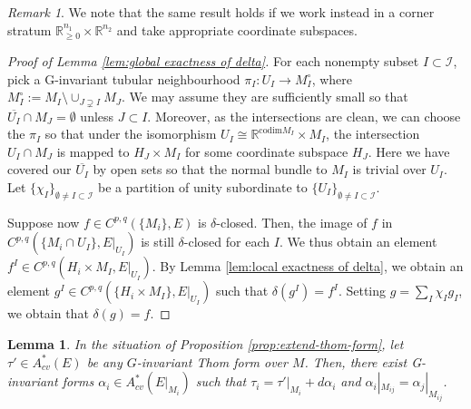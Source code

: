 \documentclass[11pt,psamsfonts, oneside, reqno]{amsart}
\newcommand{\cc}[1]{\overline{#1}}
\newcommand{\sub}{\subset}%
\newcommand{\ssuper}{\supsetneq}
\newcommand{\cl}{\colon}
\newcommand{\emst}{\emptyset}
\newcommand{\bR}{\mathbb{R}}
\newcommand{\cI}{\mathcal{I}}
\newtheorem{lemma}[theorem]{Lemma}
\theoremstyle{definition}
\theoremstyle{remark}
\newtheorem{remark}[theorem]{Remark}
\numberwithin{equation}{section}
\begin{document}
\begin{remark}
	We note that the same result holds if we work instead in a corner stratum $\bR_{\geq 0}^{n_1} \times \bR^{n_2}$ and take appropriate coordinate subspaces.
\end{remark}

\begin{proof}[Proof of Lemma \ref{lem:global exactness of delta}]
	For each nonempty subset $I\sub \cI$, pick a G-invariant tubular neighbourhood $\pi_I\cl U_I \rightarrow M^\circ_I$, where $M_I^\circ := M_I \setminus \cup_{J \ssuper I} M_J$. We may assume they are sufficiently small so that $\cc{U_I} \cap M_J = \emptyset$ unless $J \subset I$. Moreover, as the intersections are clean, we can choose the $\pi_I$ so that under the isomorphism $U_I \cong \bR^{\text{codim} M_I} \times M_I$, the intersection $U_I \cap M_J$ is mapped to $H_J \times M_I$ for some coordinate subspace $H_J$. Here we have covered our $\cc{U_I}$ by open sets so that the normal bundle to $M_I$ is trivial over $U_I$. Let $\{\chi_I\}_{\emst\neq I\sub \cI}$ be a partition of unity subordinate to $\{U_I\}_{\emst\neq I\sub \cI}$.\par Suppose now $f\in C^{p,q}(\{M_i\},E)$ is $\delta$-closed. Then, the image of $f$ in $C^{p,q}(\{M_i \cap U_I\},E|_{U_I})$ is still $\delta$-closed for each $I$. We thus obtain an element $f^I \in C^{p,q}(H_i \times M_I, E|_{U_I})$. By Lemma \ref{lem:local exactness of delta}, we obtain an element $g^I \in C^{p,q}(\{H_i \times M_I\}, E|_{U_I})$ such that $\delta(g^I)= f^I$. Setting $g = \sum_I \chi_I g_I$, we obtain that $\delta (g) = f$.
\end{proof}

\begin{lemma}
	\label{lem:can pick primitives compatibly}
	In the situation of Proposition \ref{prop:extend-thom-form}, let $\tau' \in A_{cv}^*(E)$ be any $G$-invariant Thom form over $M$. Then, there exist G-invariant forms $\alpha_i \in A_{cv}^*(E|_{M_i})$ such that $\tau_i = \tau'|_{M_i} + d\alpha_i$ and $\alpha_i|_{M_{ij}} = \alpha_j|_{M_{ij}}$.
\end{lemma}
\end{document}
